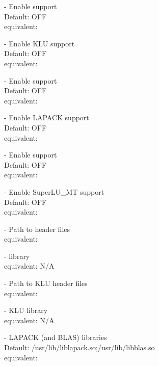\begin{description}
\item[] -
  Enable {\hypre} support
  \\
  Default: OFF
  \\
  {\sundials} equivalent: 
\item[] -
  Enable KLU support
  \\
  Default: OFF
  \\
  {\sundials} equivalent: 
\item[] -
  Enable {\petsc} support
  \\
  Default: OFF
  \\
  {\sundials} equivalent: 
\item[] -
  Enable LAPACK support
  \\
  Default: OFF
  \\
  {\sundials} equivalent: 
\item[] -
  Enable {\superludist} support
  \\
  Default: OFF
  \\
  {\sundials} equivalent: 
\item[] -
  Enable SuperLU\_MT support
  \\
  Default: OFF
  \\
  {\sundials} equivalent: 
\item[] -
  Path to {\hypre} header files
  \\
  {\sundials} equivalent: 
\item[] -
  {\hypre} library
  \\
  {\sundials} equivalent: N/A
\item[] -
  Path to KLU header files
  \\
  {\sundials} equivalent: 
\item[] -
  KLU library
  \\
  {\sundials} equivalent: N/A
\item[] -
  LAPACK (and BLAS) libraries
  \\
  Default: /usr/lib/liblapack.so;/usr/lib/libblas.so
  \\
  {\sundials} equivalent: 

\end{description}

